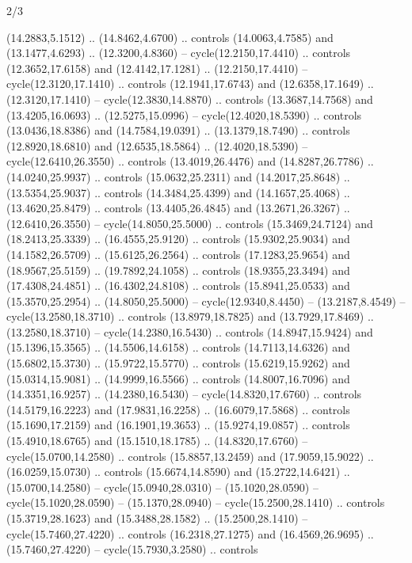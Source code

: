\begin{flagdescription}{2/3}
\begin{scope}[yshift=\flagwidth,scale=\flagwidth/1241.93737]
\begin{scope}[y=-1mm, x=1mm,draw=gold,fill=blue,line join=miter,miter limit=4,line width=1.8\lw]
\begin{scope}[y=1mm, x=1mm, yscale=-1,shift={(573.68mm+\str,145.75)}]
\begin{scope}[scale=1.35,shift={(-9,-3)}]
\begin{scope}[scale=0.55]
\begin{scope}[scale=1.333]
    (14.2883,5.1512) .. (14.8462,4.6700) .. controls (14.0063,4.7585) and
    (13.1477,4.6293) .. (12.3200,4.8360) -- cycle(12.2150,17.4410) .. controls
    (12.3652,17.6158) and (12.4142,17.1281) .. (12.2150,17.4410) --
    cycle(12.3120,17.1410) .. controls (12.1941,17.6743) and (12.6358,17.1649) ..
    (12.3120,17.1410) -- cycle(12.3830,14.8870) .. controls (13.3687,14.7568) and
    (13.4205,16.0693) .. (12.5275,15.0996) -- cycle(12.4020,18.5390) .. controls
    (13.0436,18.8386) and (14.7584,19.0391) .. (13.1379,18.7490) .. controls
    (12.8920,18.6810) and (12.6535,18.5864) .. (12.4020,18.5390) --
    cycle(12.6410,26.3550) .. controls (13.4019,26.4476) and (14.8287,26.7786) ..
    (14.0240,25.9937) .. controls (15.0632,25.2311) and (14.2017,25.8648) ..
    (13.5354,25.9037) .. controls (14.3484,25.4399) and (14.1657,25.4068) ..
    (13.4620,25.8479) .. controls (13.4405,26.4845) and (13.2671,26.3267) ..
    (12.6410,26.3550) -- cycle(14.8050,25.5000) .. controls (15.3469,24.7124) and
    (18.2413,25.3339) .. (16.4555,25.9120) .. controls (15.9302,25.9034) and
    (14.1582,26.5709) .. (15.6125,26.2564) .. controls (17.1283,25.9654) and
    (18.9567,25.5159) .. (19.7892,24.1058) .. controls (18.9355,23.3494) and
    (17.4308,24.4851) .. (16.4302,24.8108) .. controls (15.8941,25.0533) and
    (15.3570,25.2954) .. (14.8050,25.5000) -- cycle(12.9340,8.4450) --
    (13.2187,8.4549) -- cycle(13.2580,18.3710) .. controls (13.8979,18.7825) and
    (13.7929,17.8469) .. (13.2580,18.3710) -- cycle(14.2380,16.5430) .. controls
    (14.8947,15.9424) and (15.1396,15.3565) .. (14.5506,14.6158) .. controls
    (14.7113,14.6326) and (15.6802,15.3730) .. (15.9722,15.5770) .. controls
    (15.6219,15.9262) and (15.0314,15.9081) .. (14.9999,16.5566) .. controls
    (14.8007,16.7096) and (14.3351,16.9257) .. (14.2380,16.5430) --
    cycle(14.8320,17.6760) .. controls (14.5179,16.2223) and (17.9831,16.2258) ..
    (16.6079,17.5868) .. controls (15.1690,17.2159) and (16.1901,19.3653) ..
    (15.9274,19.0857) .. controls (15.4910,18.6765) and (15.1510,18.1785) ..
    (14.8320,17.6760) -- cycle(15.0700,14.2580) .. controls (15.8857,13.2459) and
    (17.9059,15.9022) .. (16.0259,15.0730) .. controls (15.6674,14.8590) and
    (15.2722,14.6421) .. (15.0700,14.2580) -- cycle(15.0940,28.0310) --
    (15.1020,28.0590) -- cycle(15.1020,28.0590) -- (15.1370,28.0940) --
    cycle(15.2500,28.1410) .. controls (15.3719,28.1623) and (15.3488,28.1582) ..
    (15.2500,28.1410) -- cycle(15.7460,27.4220) .. controls (16.2318,27.1275) and
    (16.4569,26.9695) .. (15.7460,27.4220) -- cycle(15.7930,3.2580) .. controls

\end{scope}
\end{scope}
\end{scope}
\end{scope}
\end{scope}
\end{scope}
\end{flagdescription}
